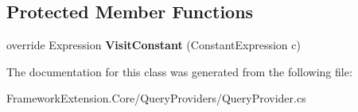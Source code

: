 \subsection*{Protected Member Functions}
\begin{DoxyCompactItemize}
\item 
\hypertarget{class_framework_extension_1_1_core_1_1_query_providers_1_1_query_translator_provider-g_a76ceefe54562ff17e72d8ec01cc3e238}{override Expression {\bfseries Visit\-Constant} (Constant\-Expression c)}\label{class_framework_extension_1_1_core_1_1_query_providers_1_1_query_translator_provider-g_a76ceefe54562ff17e72d8ec01cc3e238}

\end{DoxyCompactItemize}


The documentation for this class was generated from the following file\-:\begin{DoxyCompactItemize}
\item 
Framework\-Extension.\-Core/\-Query\-Providers/Query\-Provider.\-cs\end{DoxyCompactItemize}
